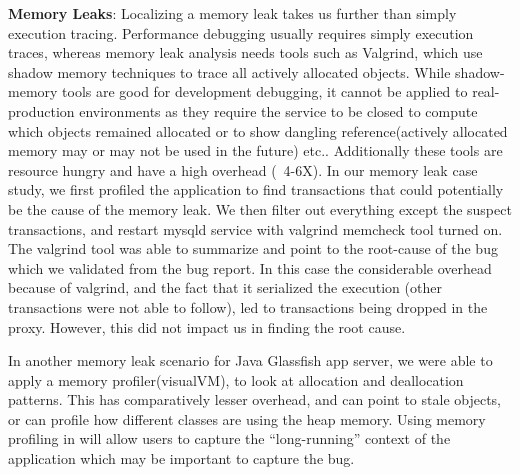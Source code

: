 \textbf{Memory Leaks}: Localizing a memory leak takes us further than simply execution tracing. 
Performance debugging usually requires simply execution traces, whereas memory leak analysis needs tools such as Valgrind\cite{valgrind}, which use shadow memory techniques to trace all actively allocated objects.
While shadow-memory tools are good for development debugging, it cannot be applied to real-production environments as they require the service to be closed to compute which objects remained allocated or to show dangling reference(actively allocated memory may or may not be used in the future) etc.. Additionally these tools are resource hungry and have a high overhead (~4-6X).
In our memory leak case study, we first profiled the application to find transactions that could potentially be the cause of the memory leak. 
We then filter out everything except the suspect transactions, and restart mysqld service with valgrind memcheck tool turned on.
The valgrind tool was able to summarize and point to the root-cause of the bug which we validated from the bug report.
In this case the considerable overhead because of valgrind, and the fact that it serialized the execution (other transactions were not able to follow), led to transactions being dropped in the proxy. However, this did not impact us in finding the root cause.

In another memory leak scenario for Java Glassfish\cite{glassfish} app server, we were able to apply a memory profiler(visualVM), to look at allocation and deallocation patterns.
This has comparatively lesser overhead, and can point to stale objects, or can profile how different classes are using the heap memory.
Using memory profiling in \parikshan will allow users to capture the ``long-running'' context of the application which may be important to capture the bug.



